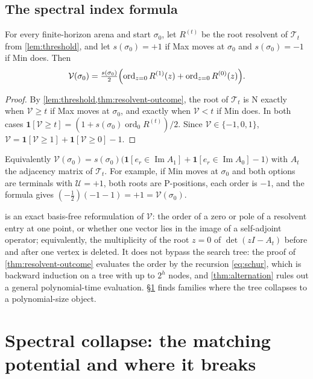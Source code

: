 \documentclass[final]{siamart0516}
\numberwithin{theorem}{section}
\numberwithin{equation}{section}
\theoremstyle{siamnonum}
\theoremstyle{plain}
\newcommand{\val}{\mathcal{V}}            %
\newcommand{\pay}{\mathcal{U}}            %
\newcommand{\ord}{\operatorname{ord}}
\newcommand{\one}{\mathbf{1}}
\begin{document}
\subsection{The spectral index formula}
\begin{corollary}\label{cor:index}
For every finite-horizon arena and start $\sigma_0$, let $R^{(t)}$ be the root resolvent of $\mathcal T_t$ from \cref{lem:threshold}, and let $s(\sigma_0)=+1$ if Max moves at $\sigma_0$ and $s(\sigma_0)=-1$ if Min does. Then
\[
\val(\sigma_0)=\tfrac{s(\sigma_0)}2\Bigl(\ord_{z=0}R^{(1)}(z)+\ord_{z=0}R^{(0)}(z)\Bigr).
\]
\end{corollary}

\begin{proof}
By \cref{lem:threshold,thm:resolvent-outcome}, the root of $\mathcal T_t$ is N exactly when $\val\ge t$ if Max moves at $\sigma_0$, and exactly when $\val<t$ if Min does. In both cases $\one[\val\ge t]=(1+s(\sigma_0)\ord_0R^{(t)})/2$. Since $\val\in\{-1,0,1\}$, $\val=\one[\val\ge1]+\one[\val\ge0]-1$.
\end{proof}

Equivalently $\val(\sigma_0)=s(\sigma_0)\bigl(\one[e_r\in\operatorname{Im}A_1]+\one[e_r\in\operatorname{Im}A_0]-1\bigr)$ with $A_t$ the adjacency matrix of $\mathcal T_t$. For example, if Min moves at $\sigma_0$ and both options are terminals with $\pay=+1$, both roots are P-positions, each order is $-1$, and the formula gives $(-\frac12)(-1-1)=+1=\val(\sigma_0)$.

\begin{remark}\label{rem:index}
 is an exact basis-free reformulation of $\val$: the order of a zero or pole of a resolvent entry at one point, or whether one vector lies in the image of a self-adjoint operator; equivalently, the multiplicity of the root $z=0$ of $\det(zI-A_t)$ before and after one vertex is deleted. It does not bypass the search tree: the proof of \cref{thm:resolvent-outcome} evaluates the order by the recursion \eqref{eq:schur}, which is backward induction on a tree with up to $2^h$ nodes, and \cref{thm:alternation} rules out a general polynomial-time evaluation. \S\ref{sec:matching} finds families where the tree collapses to a polynomial-size object.
\end{remark}

\section{Spectral collapse: the matching potential and where it breaks}\label{sec:matching}
\end{document}
